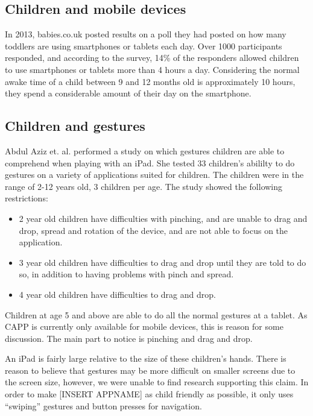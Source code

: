 \subsection{Children and mobile devices}
In 2013, babies.co.uk posted results on a poll they had posted on how many toddlers are using smartphones or tablets each day\cite{babiesusageoftablets}. Over 1000 participants responded,  and according to the survey, 14\% of the responders allowed children to use smartphones or tablets more than 4 hours a day. Considering the normal awake time of a child between 9 and 12 months old is approximately 10 hours, they spend a considerable amount of their day on the smartphone.        


\subsection{Children and gestures}

Abdul Aziz et. al. \cite{aziz2013children} performed a study on which gestures children are able to comprehend when playing with an iPad. She tested 33 children's abililty to do gestures on a variety of applications suited for children. The children were in the range of 2-12 years old, 3 children per age. The study showed the following restrictions:

\begin{itemize}
  \item 2 year old children have difficulties with pinching, and are unable to drag and drop, spread and rotation of the device, and are not able to focus on the application. 
  \item 3 year old children have difficulties to drag and drop until they are told to do so, in addition to having problems with pinch and spread. 
  \item 4 year old children have difficulties to drag and drop. 
\end{itemize}
Children at age 5 and above are able to do all the normal gestures at a tablet. As CAPP is currently only available for mobile devices, this is reason for some discussion. The main part to notice is pinching and drag and drop. 

An iPad is fairly large relative to the size of these children's hands. There is reason to believe that gestures may be more difficult on smaller screens due to the screen size, however, we were unable to find research supporting this claim. In order to make [INSERT APPNAME] as child friendly as possible, it only uses ``swiping'' gestures and button presses for navigation.

